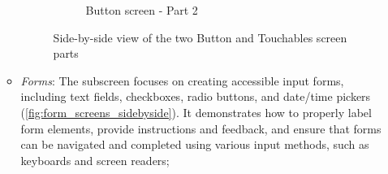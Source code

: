 \begin{enumerate}
\begin{itemize}
\begin{figure}[ht]
\begin{subfigure}[b]{0.48\textwidth}
                \caption{Button screen - Part 2}
                \label{fig:button-right}
            \end{subfigure}
            \caption{Side-by-side view of the two Button and Touchables screen parts}
            \label{fig:button_screens_sidebyside}
        \end{figure}

        \FloatBarrier

        \item \textit{Forms}: The subscreen focuses on creating accessible input forms, including text fields, checkboxes, radio buttons, and date/time pickers (\ref{fig:form_screens_sidebyside}). It demonstrates how to properly label form elements, provide instructions and feedback, and ensure that forms can be navigated and completed using various input methods, such as keyboards and screen readers;


\end{itemize}
\end{enumerate}
